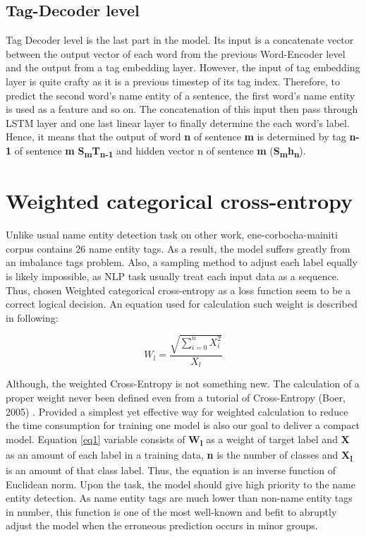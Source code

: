 \begin{CJK*}{UTF8}{min}
\subsection{Tag-Decoder level}
Tag Decoder level is the last part in the model.
Its input is a concatenate vector between the output vector of each word from the previous Word-Encoder level and the output from a tag embedding layer.
However, the input of tag embedding layer is quite crafty as it is a previous timestep of its tag index.
Therefore, to predict the second word's name entity of a sentence, the first word's name entity is used as a feature and so on.
The concatenation of this input then pass through LSTM layer and one last linear layer to finally determine the each word's label.
Hence, it means that the output of word \textbf{n} of sentence \textbf{m} is determined by tag \textbf{n-1} of sentence \textbf{m} \textbf{S\textsubscript{m}T\textsubscript{n-1}} and hidden vector n of sentence \textbf{m} (\textbf{S\textsubscript{m}h\textsubscript{n}}).

\section{Weighted categorical cross-entropy}
Unlike usual name entity detection task on other work, ene-corbocha-mainiti corpus contains 26 name entity tags.
As a result, the model suffers greatly from an imbalance tags problem.
Also, a sampling method to adjust each label equally is likely impossible, as NLP task usually treat each input data as a sequence.
Thus, chosen Weighted categorical cross-entropy as a loss function
seem to be a correct logical decision.
An equation used for calculation such weight is described in following: 

\begin{equation} \label{eq1}
W_l = \frac{
    \sqrt{
    \sum_{i=0}^{n} X_i^2
    }
}{X_l} 
\end{equation}

Although, the weighted Cross-Entropy is not something new.
The calculation of a proper weight never been defined even from a tutorial of Cross-Entropy (Boer, 2005) \cite{750fabedbacb467c8fafd98b87f77436}.
Provided a simplest yet effective way for weighted calculation to reduce the time consumption for training one model is also our goal to deliver a compact model.
Equation \ref{eq1} variable consists of \textbf{W\textsubscript{l}} as a weight of target label and \textbf{X} as an amount of each label in a training data, \textbf{n} is the number of classes and \textbf{X\textsubscript{l}} is an amount of that class label.
Thus, the equation is an inverse function of Euclidean norm.
Upon the task, the model should give high priority to the name entity detection.
As name entity tags are much lower than non-name entity tags in number, this function is one of the most well-known and befit to abruptly adjust the model when the erroneous prediction occurs in minor groups.



\end{CJK*}
